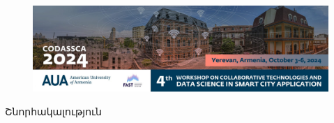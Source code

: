 \documentclass[aspectratio=169]{beamer}
\begin{document}
\begin{frame}
\begin{figure}
    \centering
    \includegraphics[scale=0.27]{../../fig/AUA_Codassca2024_website-100-2048x596.jpg}
\end{figure}
    
\end{frame}

\begin{frame}
    \begin{center}
        \Huge Շնորհակալություն
    \end{center}
\end{frame}
\end{document}
